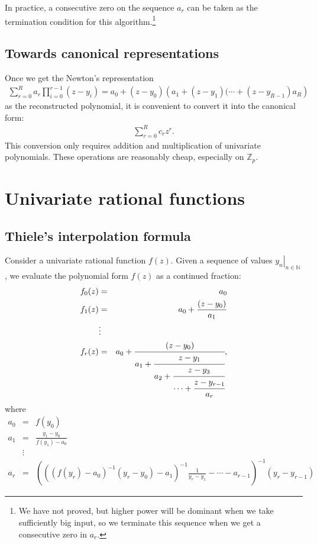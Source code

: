 \documentclass[11pt]{book}
\begin{document}
In practice, a consecutive zero on the sequence $a_r$ can be taken as the termination condition for this algorithm.\footnote{
We have not proved, but higher power will be dominant when we take sufficiently big input, so we terminate this sequence when we get a consecutive zero in $a_r$.
}

\subsection{Towards canonical representations}
Once we get the Newton's representation
\begin{eqnarray}
\sum_{r=0}^R a_r \prod_{i=0}^{r-1}(z - y_i) = a_0 + (z-y_0) \left(a_1 + (z-y_1)(\cdots + (z - y_{R-1})a_R \right) \quad
\end{eqnarray}
as the reconstructed polynomial, it is convenient to convert it into the canonical form:
\begin{eqnarray}
\sum_{r=0}^R c_r z^r.
\end{eqnarray}
This conversion only requires addition and multiplication of univariate polynomials.
These operations are reasonably cheap, especially on $\mathbb{Z}_p$. 


\section{Univariate rational functions}
\subsection{Thiele's interpolation formula}
Consider a univariate rational function $f(z)$.
Given a sequence of values $\left. y_n \right|_{n \in \mathbb{N}}$, we evaluate the polynomial form $f(z)$ as a continued fraction:
\begin{eqnarray}
f_0(z) &=& a_0 \\
f_1(z) &=& a_0 + \frac{(z-y_0)}{a_1} \\
\nonumber
&\vdots& \\
f_r(z) &=& a_0 + \cfrac{(z-y_0)}{a_1 + \cfrac{z-y_1}{a_2 + \cfrac{z- y_3}{\cdots + \cfrac{z-y_{r-1}}{a_r}}}},
\end{eqnarray}
where
\begin{eqnarray}
a_0 &=& f(y_0) \\
a_1 &=& \frac{y_1 - y_0}{f(y_1) - a_0}\\
\nonumber
&\vdots& \\
a_r &=& \left( \left( \left( f(y_r)-a_0 \right)^{-1} (y_r - y_0) - a_1 \right)^{-1} \frac{1}{y_r - y_1} - \cdots - a_{r-1} \right)^{-1} (y_r - y_{r-1}) \qquad\qquad
\end{eqnarray}
\end{document}
